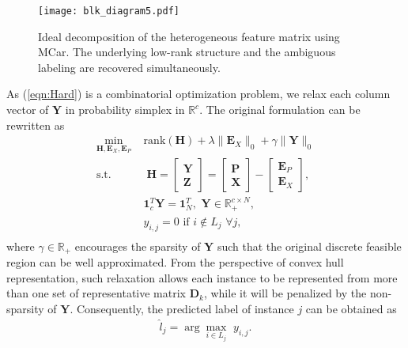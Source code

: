 \documentclass[10pt,journal,compsoc]{IEEEtran}
\begin{document}
\begin{figure}[tb]\center
    \texttt{[image: blk\_diagram5.pdf]}
    \caption{Ideal decomposition of the heterogeneous feature matrix using MCar. The underlying low-rank structure and the ambiguous labeling are recovered simultaneously.}
    \label{fig:LRM}
\end{figure}




As (\ref{eqn:Hard}) is a combinatorial optimization problem, we relax each column vector of $\mathbf{Y}$ in probability simplex in $\mathbb{R}^c$.
The original formulation can be rewritten as
\begin{equation}
\begin{aligned}
 \min_{\mathbf{H}, \mathbf{E}_X, \mathbf{E}_P} \,\, & \mathrm{rank} (\mathbf{H}) + \lambda \|\mathbf{E}_X\|_0  +  \gamma \|\mathbf{Y}\|_0\\
 \text{s.t.} & \;
{\mathbf{H}}= \begin{bmatrix}
\mathbf{Y} \\
\mathbf{Z}
\end{bmatrix}= \begin{bmatrix}
\mathbf{P} \\
\mathbf{X}
\end{bmatrix} - \begin{bmatrix}
\mathbf{E}_P \\
\mathbf{E}_X
\end{bmatrix},\\
& \mathbf{1}^T_c \mathbf{Y} = \mathbf{1}^T_N, \,\, \mathbf{Y} \in \mathbb{R}_+^{c \times N}, \\
& y_{i,j} = 0 \,\, \mathrm{if}  \,\, i \notin L_j \,\, \forall j, \\
\end{aligned}\label{eqn:Y_relaxed1}
\end{equation}
where $\gamma \in \mathbb{R}_+$ encourages the sparsity of $\mathbf{Y}$ such that the original discrete feasible region can be well approximated.
From the perspective of convex hull representation, such relaxation allows each instance to be represented from more than one set of representative matrix $\mathbf{D}_k$, while it will be penalized by the non-sparsity of $\mathbf{Y}$.
Consequently, the predicted label of instance $j$ can be obtained as
\begin{equation}
\begin{aligned}
\hat{l}_j = \arg \max_{i \in L_j} \,\,  y_{i,j}.
\end{aligned}\label{eqn:ypredict}
\end{equation}
\end{document}
